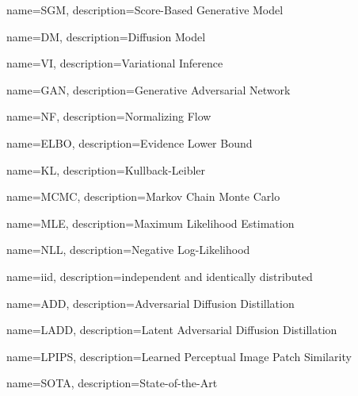 {
	name=SGM,
	description={Score-Based Generative Model}
}

{
    name=DM,
    description={Diffusion Model}
}

{
	name=VI,
	description={Variational Inference}
}

{
    name=GAN,
    description={Generative Adversarial Network}
}

{
    name=NF,
    description={Normalizing Flow}
}

{
    name=ELBO,
    description={Evidence Lower Bound}
}

{
    name=KL,
    description={Kullback-Leibler}
}

{
    name=MCMC,
    description={Markov Chain Monte Carlo}
}

{
    name=MLE,
    description={Maximum Likelihood Estimation}
}

{
    name=NLL,
    description={Negative Log-Likelihood}
}

{
    name=iid,
    description={independent and identically distributed}
}

{
    name=ADD,
    description={Adversarial Diffusion Distillation}
}

{
    name=LADD,
    description={Latent Adversarial Diffusion Distillation}
}

{
    name=LPIPS,
    description={Learned Perceptual Image Patch Similarity}
}

{
    name=SOTA,
    description={State-of-the-Art}
}